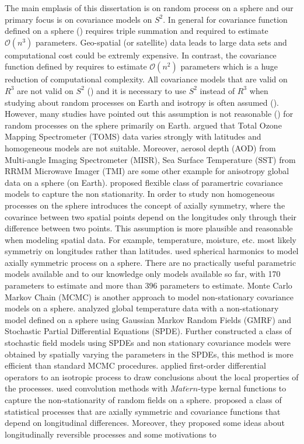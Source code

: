 		The main emplasis of this dissertation is on random process on a sphere and our primary focus is on covariance models on $S^2$. In general for covariance function defined on a sphere (\cite{Stein2007}) requires triple summation and required to estimate $\mathcal{O}(n^3)$ parameters. Geo-spatial (or satellite) data leads to large data sets and computational cost could be extremly expensive. In contrast, the covariance function  defined by \cite{Huang2012} requires to estimate $\mathcal{O}(n^2)$ parameters which is a huge reduction of computational complexity. All covariance models that are valid on $R^3$ are not valid on $S^2$ (\cite{HuangZhangRobeson2011}) and it is necessary to use $S^2$ instead of $R^3$ when studying about random processes on Earth and isotropy is often assumed (\cite{Yadrenko1983, Yaglom1987}). However, many studies have pointed out this assumption is not reasonable (\cite{Stein2007, JunStein2008, BolinLindgren2011}) for random processes on the sphere primarily on Earth. \cite{Stein2007} argued that Total Ozone Mapping Spectrometer (TOMS) data varies strongly with latitudes and homogeneous models are not suitable. Moreover, aerosol depth (AOD) from Multi-angle Imaging Spectrometer (MISR), Sea Surface Temperature (SST) from RRMM Microwave Imager (TMI) are some other example for anisotropy global data on a sphere (on Earth). \cite{JunStein2008} proposed flexible class of paramertric covariance models to capture the non stationarity.  In order to study non homogeneous processes on the sphere \cite{Jones1963} introduces the concept of axially symmetry, where the covarince between two spatial points depend on the longitudes only through their difference  between two points. This assumption is more plausible and reasonable when modeling spatial data. For example, temperature, moisture, etc. most likely symmetriy on longitudes rather than latitudes. \cite{Stein2007} used spherical harmonics to model axially symmetric process on a sphere. There are no practically useful parametric models available and to our knowledge only models available so far, \cite{stein1999} with 170 parameters to estimate and \cite{CressieJohannesson2008} more than 396 parameters to estimate. Monte Carlo Markov Chain (MCMC) is another approach to model non-stationary covariance models on a sphere. \cite{Lindgren2011} analyzed global temperature data with a non-stationary model defined on a sphere using Gaussian Markov Random Fields (GMRF) and Stochastic Partial Differential Equations (SPDE). Further \cite{BolinLindgren2011} constructed a class of stochastic field models using SPDEs and non stationary covariance models were obtained by spatially varying the parameters in the SPDEs, this method is more efficient than standard MCMC procedures. \cite{HitczenkoStein2012} applied first-order differential operators to an isotropic process to draw conclusions about the local properties of the processes. \cite{Li2013} used convolution methods with $Mat\acute{e}rn$-type kernal functions to capture the non-stationarity of random fields on a sphere. \cite{Huang2012} proposed a class of statistical processes that are axially symmetric and covariance functions that depend on longitudinal differences. Moreover, they proposed some ideas about longitudinally reversible processes and some motivations to 